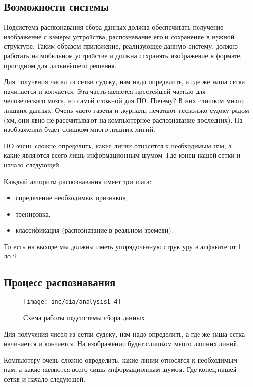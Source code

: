 \subsection{Возможности системы}

Подсистема распознавания сбора данных должна обеспечивать получение изображение с камеры устройства, распознавание его и сохранение в нужной структуре.  Таким образом приложение, реализующее данную систему, должно работать на мобильном устройстве и должна сохранять изображение в формате, пригодном для дальнейшего решения. 

Для получения чисел из сетки судоку, нам надо определить, а где же наша сетка начинается и кончается. Эта часть является простейшей частью для человеческого мозга, но самой сложной для ПО. Почему? В них слишком много лишних данных. Очень часто газеты и журналы печатают несколько судоку рядом (хм, они явно не рассчитывают на компьютерное распознавание последних). На изображении будет слишком много лишних линий. 

ПО очень сложно определить, какие линии относятся к необходимым нам, а какие являются всего лишь информационным шумом. Где конец нашей сетки и начало следующей.

Каждый алгоритм распознавания имеет три шага:
\begin{itemize}
\item определение необходимых признаков,
\item тренировка,
\item классификация (распознавание в реальном времени).
\end{itemize}

То есть на выходе мы должны иметь упорядоченную структуру в алфавите от 1 до 9.

\subsection{Процесс распознавания}
\begin{figure}
  \centering
  \texttt{[image: inc/dia/analysis1-4]}
  \caption{Схема работы подсистемы сбора данных}
  \label{fig:fig04}
\end{figure}
Для получения чисел из сетки судоку, нам надо определить, а где же наша сетка начинается и кончается.  На изображении будет слишком много лишних линий. 

Компьютеру очень сложно определить, какие линии относятся к необходимым нам, а какие являются всего лишь информационным шумом. Где конец нашей сетки и начало следующей.

